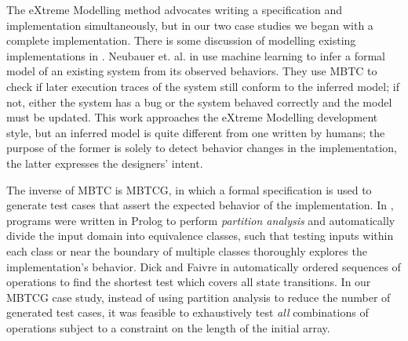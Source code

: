 \documentclass{vldb}
\begin{document}
The eXtreme Modelling method advocates writing a specification and implementation simultaneously, but in our two case studies we began with a complete implementation. 
There is some discussion of modelling existing implementations in \cite{Newcombe2014UseOfFormalMethodsAmazon}.
Neubauer et. al. in \cite{Neubauer12AutomatedContinuousQualityAssurance} use machine learning to infer a formal model of an existing system from its observed behaviors.
They use MBTC to check if later execution traces of the system still conform to the inferred model; if not, either the system has a bug or the system behaved correctly and the model must be updated.
This work approaches the eXtreme Modelling development style, but an inferred model is quite different from one written by humans; the purpose of the former is solely to detect behavior changes in the implementation, the latter expresses the designers' intent.

The inverse of MBTC is MBTCG, in which a formal specification is used to generate test cases that assert the expected behavior of the implementation. In \cite{Dick93AutomatingGenerationOfTests, Legeard02AutomatedBoundaryTesting}, programs were written in Prolog to perform \textit{partition analysis} and automatically divide the input domain into equivalence classes, such that testing inputs within each class or near the boundary of multiple classes thoroughly explores the implementation's behavior. Dick and Faivre in \cite{Dick93AutomatingGenerationOfTests} automatically ordered sequences of operations to find the shortest test which covers all state transitions. In our MBTCG case study, instead of using partition analysis to reduce the number of generated test cases, it was feasible to exhaustively test \textit{all} combinations of operations subject to a constraint on the length of the initial array.
\end{document}
